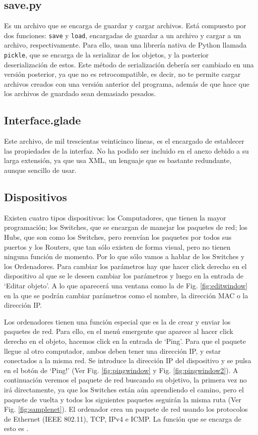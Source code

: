 \documentclass[a4paper, 11pt]{report} %
\begin{document}
\subsection{save.py}
Es un archivo que se encarga de guardar y cargar archivos. Está compuesto por dos funciones: \texttt{save} y \texttt{load}, encargadas de guardar a un archivo y cargar a un archivo, respectivamente. Para ello, usan una librería nativa de Python llamada \texttt{pickle}, que se encarga de la \gls{serializar} de los objetos, y la posterior deserialización de estos. Este método de serialización debería ser cambiado en una versión posterior, ya que no es retrocompatible, es decir, no te permite cargar archivos creados con una versión anterior del programa, además de que hace que los archivos de guardado sean demasiado pesados.

\subsection{Interface.glade}
Este archivo, de mil trescientas veinticinco líneas, es el encargado de establecer las propiedades de la interfaz. No ha podido ser incluido en el anexo debido a su larga extensión, ya que usa XML, un lenguaje que es bastante redundante, aunque sencillo de usar.

\subsection{Dispositivos}
Existen cuatro tipos dispositivos: los Computadores, que tienen la mayor programación; los Switches, que se encargan de manejar los paquetes de red; los Hubs, que son como los Switches, pero reenvían los paquetes por todos sus puertos y los Routers, que tan sólo existen de forma visual, pero no tienen ninguna función de momento. Por lo que sólo vamos a hablar de los Switches y los Ordenadores. Para cambiar los parámetros hay que hacer click derecho en el dispositivo al que se le deseen cambiar los parámetros y luego en la entrada de `Editar objeto'. A lo que aparecerá una ventana como la de Fig. \ref{fig:editwindow} en la que se podrán cambiar parámetros como el nombre, la dirección MAC o la dirección IP.

Los ordenadores tienen una función especial que es la de crear y enviar los paquetes de red. Para ello, en el menú emergente que aparece al hacer click derecho en el objeto, hacemos click en la entrada de `Ping'. Para que el paquete llegue al otro computador, ambos deben tener una dirección IP, y estar conectados a la misma red. Se introduce la dirección IP del dispositivo y se pulsa en el botón de `Ping!' (Ver Fig. \ref{fig:pingwindow} y Fig. \ref{fig:pingwindow2}). A continuación veremos el paquete de red buscando su objetivo, la primera vez no irá directamente, ya que los Switches están aún aprendiendo el camino, pero el paquete de vuelta y todos los siguientes paquetes seguirán la misma ruta (Ver Fig. \ref{fig:samplenet}). El ordenador crea un paquete de red usando los protocolos de Ethernet (IEEE 802.11), TCP, IPv4 e ICMP. La función que se encarga de esto es .
\end{document}
